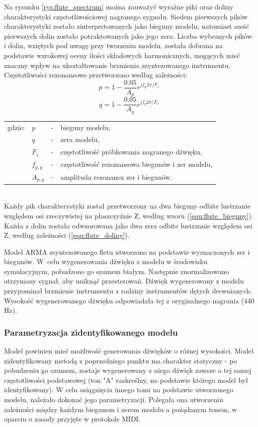 Na rysunku \ref{rys:flute_spectrum} można zauważyć wyraźne piki oraz doliny charakterystyki częstotliwościowej nagranego sygnału. Siedem pierwszych pików charakterystyki zostało zinterpretowanych jako bieguny modelu, natomiast sześć pierwszych dolin zostało potraktowanych jako jego zera. Liczba wybranych pików i dolin, wziętych pod uwagę przy tworzeniu modelu, została dobrana na podstawie wzrokowej oceny ilości składowych harmonicznych, mogących mieć znaczny wpływ na ukształtowanie brzmienia zsyntezowanego instrumentu. Częstotliwości rezonansowe przetworzono według zależności:
\begin{equation} \label{equ:flute_bieguny}
p = 1-\frac{0.05}{A_{p}}e^{jf_{p}2\pi/F_{s}}
\end{equation}
\begin{equation} \label{equ:flute_doliny}
q = 1-\frac{0.05}{A_{q}}e^{jf_{q}2\pi/F_{s}}
\end{equation}
\begin{tabular}{ l l l l}
	gdzie: & $p$ &  - & bieguny modelu, \\
	&	$q$ & - &  zera modelu, \\
	&	$F_{s}$ & - &  częstotliwość próbkowania nagranego dźwięku,\\
	&	$f_{p,q}$ & - &  częstotliwość rezonansowa biegunów i zer modelu, \\
	&	$A_{p,q}$ & - &  amplituda rezonansu zer i biegunów. \\
\end{tabular} \\

Każdy pik charakterystyki został przetworzony na dwa bieguny odbite lustrzanie względem osi rzeczywistej na płaszczyźnie Z, według wzoru (\ref{equ:flute_bieguny}). Każda z dolin została odwzorowana jako dwa zera odbite lustrzanie względem osi Z, według zależności (\ref{equ:flute_doliny}).

Model ARMA zsyntezowanego fletu utworzono na podstawie wyznaczonych zer i biegunów. W~celu wygenerowania dźwięku z modelu w środowisku symulacyjnym, pobudzono go szumem białym. Następnie znormalizowano otrzymany sygnał, aby uniknąć przesterowań. Dźwięk wygenerowany z modelu przypominał brzmienie instrumentu z rodziny instrumentów dętych drewnianych. Wysokość wygenerowanego dźwięku odpowiadała tej z oryginalnego nagrania (440 Hz).

\subsubsection{Parametryzacja zidentyfikowanego modelu}
Model powinien mieć możliwość generowania dźwięków o różnej wysokości. Model zidentyfikowany metodą z poprzedniego punktu ma charakter statyczny - po pobudzeniu go szumem, zostaje wygenerowany z niego dźwięk zawsze o tej samej częstotliwości podstawowej (ton "A" razkreślny, na podstawie którego model był identyfikowany). W celu osiągnięcia innego tonu na podstawie utworzonego modelu, należało dokonać jego parametryzacji. Polegała ona utworzeniu zależności między każdym biegunem i zerem modelu a pożądanym tonem, w oparciu o zasady przyjęte w protokole MIDI.

